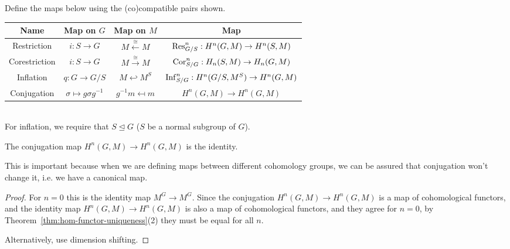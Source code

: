 \begin{df}
Define the maps below using the (co)compatible pairs shown.\\

\noindent
\begin{tabular}{|c|c|c|c|}
\hline 
Name & Map on $G$ & Map on $M$ & Map\tabularnewline
\hline 
Restriction & $i:S\to G$ & $M\xleftarrow{\cong} M$ & $\operatorname{Res}_{G/S}^{n}:H^{n}(G,M)\to H^{n}(S,M)$\tabularnewline
\hline 
Corestriction & $i:S\to G$ & $M\xrightarrow{\cong} M$ & $\operatorname{Cor}_{S/G}^{n}:H_{n}(S,M)\to H_{n}(G,M)$\tabularnewline
\hline 
Inflation & $q:G\to G/S$ & $M\hookleftarrow M^{S}$ & $\operatorname{Inf}_{S/G}^{n}:H^{n}(G/S,M^{S})\to H^{n}(G,M)$\tabularnewline
\hline 
Conjugation & $\sigma\mapsto g\sigma g^{-1}$ & $g^{-1}m\mapsfrom m$ & $H^{n}(G,M)\to H^{n}(G,M)$\tabularnewline
\hline 
\end{tabular}\\

For inflation, we require that $S\trianglelefteq G$ ($S$ be a normal subgroup of $G$).

\end{df}
\begin{pr}
The conjugation map $H^n(G,M)\to H^n(G,M)$ is the identity.
\end{pr}
This is important because when we are defining maps between different cohomology groups, we can be assured that conjugation won't change it, i.e. we have a canonical map.
\begin{proof}
For $n=0$ this is the identity map $M^G\to M^G$. Since the conjugation $H^n(G,M)\to H^n(G,M)$ is a map of cohomological functors, and the identity map $H^n(G,M)\to H^n(G,M)$ is also a map of cohomological functors, and they agree for $n=0$, by Theorem~\ref{thm:hom-functor-uniqueness}(2) they must be equal for all $n$.

Alternatively, use dimension shifting.
\end{proof}
